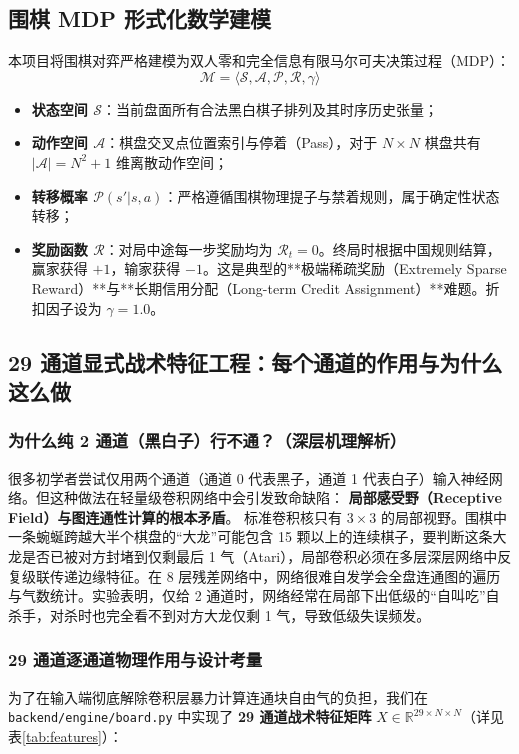 \documentclass[11pt,a4paper]{ctexart}
\newcommand{\rb}[1]{\ensuremath{\mathbb{R}^{#1}}}
\newcommand{\tabref}[1]{表\ref{#1}}
\begin{document}
\subsection{围棋 MDP 形式化数学建模}

本项目将围棋对弈严格建模为双人零和完全信息有限马尔可夫决策过程（MDP）：
\begin{equation}
\mathcal{M} = \langle \mathcal{S}, \mathcal{A}, \mathcal{P}, \mathcal{R}, \gamma \rangle
\end{equation}
\begin{itemize}
  \item \textbf{状态空间 $\mathcal{S}$}：当前盘面所有合法黑白棋子排列及其时序历史张量；
  \item \textbf{动作空间 $\mathcal{A}$}：棋盘交叉点位置索引与停着（Pass），对于 $N\times N$ 棋盘共有 $|\mathcal{A}| = N^2 + 1$ 维离散动作空间；
  \item \textbf{转移概率 $\mathcal{P}(s'|s, a)$}：严格遵循围棋物理提子与禁着规则，属于确定性状态转移；
  \item \textbf{奖励函数 $\mathcal{R}$}：对局中途每一步奖励均为 $\mathcal{R}_t = 0$。终局时根据中国规则结算，赢家获得 $+1$，输家获得 $-1$。这是典型的**极端稀疏奖励（Extremely Sparse Reward）**与**长期信用分配（Long-term Credit Assignment）**难题。折扣因子设为 $\gamma = 1.0$。
\end{itemize}

\subsection{29 通道显式战术特征工程：每个通道的作用与为什么这么做}

\subsubsection{为什么纯 2 通道（黑白子）行不通？（深层机理解析）}
很多初学者尝试仅用两个通道（通道 0 代表黑子，通道 1 代表白子）输入神经网络。但这种做法在轻量级卷积网络中会引发致命缺陷：
\textbf{局部感受野（Receptive Field）与图连通性计算的根本矛盾}。
标准卷积核只有 $3\times3$ 的局部视野。围棋中一条蜿蜒跨越大半个棋盘的“大龙”可能包含 15 颗以上的连续棋子，要判断这条大龙是否已被对方封堵到仅剩最后 1 气（Atari），局部卷积必须在多层深层网络中反复级联传递边缘特征。在 8 层残差网络中，网络很难自发学会全盘连通图的遍历与气数统计。实验表明，仅给 2 通道时，网络经常在局部下出低级的“自叫吃”自杀手，对杀时也完全看不到对方大龙仅剩 1 气，导致低级失误频发。

\subsubsection{29 通道逐通道物理作用与设计考量}
为了在输入端彻底解除卷积层暴力计算连通块自由气的负担，我们在 \texttt{backend/engine/board.py} 中实现了 \textbf{29 通道战术特征矩阵} $X \in \rb{29 \times N \times N}$（详见\tabref{tab:features}）：
\end{document}
